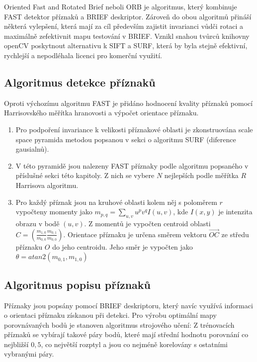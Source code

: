 	Oriented Fast and Rotated Brief neboli ORB je algoritmus, který kombinuje FAST detektor příznaků a BRIEF deskriptor. Zároveň do obou algoritmů přináší některá vylepšení, která mají za cíl především zajistit invarianci vůdči rotaci a maximálně zefektivnit mapu testování v BRIEF. Vznikl snahou tvůrců knihovny openCV poskytnout alternativu k SIFT a SURF, která by byla stejně efektivní, rychlejší a nepodléhala licenci pro komerční využití.
	
	\subsection{Algoritmus detekce příznaků}
	
	Oproti výchozímu algoritmu FAST je přidáno hodnocení kvality příznaků pomocí Harrisovského měřítka hranovosti a výpočet orientace příznaku.
	
	\begin{enumerate}
		\item Pro podpoření invariance k velikosti příznakové oblasti je zkonstruována scale space pyramida metodou popsanou v sekci o algoritmu SURF (diference gausialnů).
		\item V této pyramidě jsou nalezeny FAST příznaky podle algoritmu popsaného v příslušné sekci této kapitoly. Z nich se vybere $N$ nejlepších podle měřítka $R$ Harrisova algoritmu.
		\item Pro každý příznak jsou na kruhové oblasti kolem něj s poloměrem $r$ vypočteny momenty jako $m_{p,q} = \sum_{u,v} u^p v^q I(u,v)$, kde $I(x,y)$ je intenzita obrazu v bodě $(u,v)$. Z momentů je vypočten centroid oblasti $C = (\frac{m_{1,0}}{m_{0,0}} \frac{m_{0,1}}{m_{0,0}})$. Orientace příznaku je určena směrem vektoru $\vec{OC}$ ze středu příznaku $O$ do jeho centroidu. Jeho směr je vypočten jako $\theta = atan2(m_{0,1}, m_{1,0})$
	\end{enumerate}
	
	\subsection{Algoritmus popisu příznaků}
	
	Příznaky jsou popsány pomocí BRIEF deskriptoru, který navíc využívá informaci o orientaci příznaku získanou při detekci. Pro výrobu optimální mapy porovnávaných bodů je stanoven algoritmus strojového učení: Z trénovacích příznaků se vybírají takové páry bodů, které mají střední hodnotu porovnání co nejbližší $0,5$, co největší rozptyl a jsou co nejméně korelovány s ostatními vybranými páry.
	
